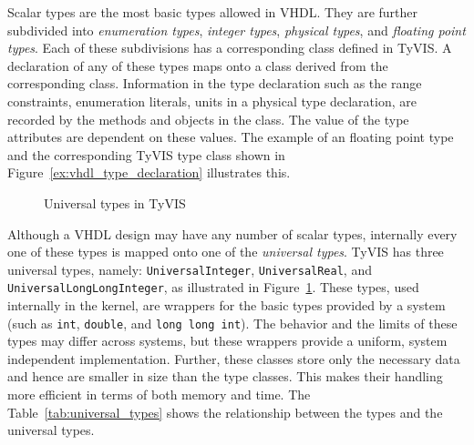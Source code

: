 \documentclass[11pt]{article}
\begin{document}
Scalar types are the most basic types allowed in VHDL.  They are
further subdivided into \textit{enumeration types}, \textit{integer
types}, \textit{physical types}, and \textit{floating point types}.
Each of these subdivisions has a corresponding \Cpp\/ class defined in
TyVIS.  A declaration of any of these types maps onto a \Cpp\/ class
derived from the corresponding class.  Information in the type
declaration such as the range constraints, enumeration literals, units
in a physical type declaration, are recorded by the methods and
objects in the class.  The value of the type attributes are dependent
on these values.  The example of an floating point type and the
corresponding TyVIS type class shown in
Figure~\ref{ex:vhdl_type_declaration} illustrates this.


\begin{figure}[htbp]
  \centerline{}
  \caption{Universal types in TyVIS}
  \label{fig:VHDLData}
\end{figure}

Although a VHDL design may have any number of scalar types, internally
every one of these types is mapped onto one of the \textit{universal
types}.  TyVIS has three universal types, namely: \texttt{UniversalInteger},
\texttt{UniversalReal}, and \texttt{UniversalLongLongInteger}, as 
illustrated in Figure~\ref{fig:VHDLData}.  These types, used
internally in the kernel, are wrappers for the basic types provided by
a system (such as \texttt{int}, \texttt{double}, and \texttt{long long
int}).  The behavior and the limits of these types may differ across
systems, but these wrappers provide a uniform, system independent
implementation.  Further, these classes store only the necessary data
and hence are smaller in size than the type classes.  This makes their
handling more efficient in terms of both memory and time.  The
Table~\ref{tab:universal_types} shows the relationship between the
types and the universal types.
\end{document}
